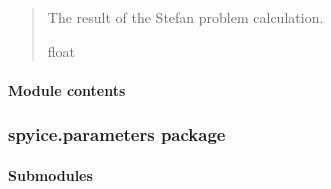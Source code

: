 \documentclass[a4paper,11pt,english,openany]{sphinxmanual}
\begin{document}
\begin{fulllineitems}
\begin{fulllineitems}
\begin{quote}
\begin{description}
\begin{itemize}
\end{itemize}

\sphinxAtStartPar
The result of the Stefan problem calculation.

\sphinxAtStartPar
float

\end{description}\end{quote}

\end{fulllineitems}


\end{fulllineitems}



\paragraph{Module contents}
\label{\detokenize{api/spyice.models:module-spyice.models}}\label{\detokenize{api/spyice.models:module-contents}}
\sphinxstepscope


\subsubsection{spyice.parameters package}
\label{\detokenize{api/spyice.parameters:spyice-parameters-package}}\label{\detokenize{api/spyice.parameters::doc}}

\paragraph{Submodules}
\label{\detokenize{api/spyice.parameters:submodules}}
\sphinxstepscope
{}\label{\detokenize{api/spyice.parameters.constants:module-spyice.parameters.constants}}
\end{document}
